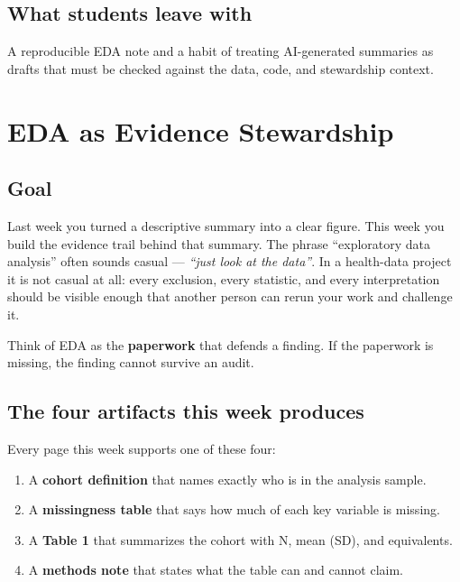 \documentclass[
  letterpaper,
  DIV=11,
  numbers=noendperiod,
  oneside]{scrreprt}
\providecommand{\tightlist}{%
  \setlength{\itemsep}{0pt}\setlength{\parskip}{0pt}}
\begin{document}
\section*{What students leave with}\label{what-students-leave-with-2}


A reproducible EDA note and a habit of treating AI-generated summaries
as drafts that must be checked against the data, code, and stewardship
context.

\chapter*{EDA as Evidence
Stewardship}\label{eda-as-evidence-stewardship}


\section*{Goal}\label{goal-4}


Last week you turned a descriptive summary into a clear figure. This
week you build the evidence trail behind that summary. The phrase
``exploratory data analysis'' often sounds casual --- \emph{``just look
at the data''}. In a health-data project it is not casual at all: every
exclusion, every statistic, and every interpretation should be visible
enough that another person can rerun your work and challenge it.

Think of EDA as the \textbf{paperwork} that defends a finding. If the
paperwork is missing, the finding cannot survive an audit.

\section*{The four artifacts this week
produces}\label{the-four-artifacts-this-week-produces}


Every page this week supports one of these four:

\begin{enumerate}
\def\labelenumi{\arabic{enumi}.}
\tightlist
\item
  A \textbf{cohort definition} that names exactly who is in the analysis
  sample.
\item
  A \textbf{missingness table} that says how much of each key variable
  is missing.
\item
  A \textbf{Table 1} that summarizes the cohort with N, mean (SD), and
  equivalents.
\item
  A \textbf{methods note} that states what the table can and cannot
  claim.
\end{enumerate}
\end{document}
